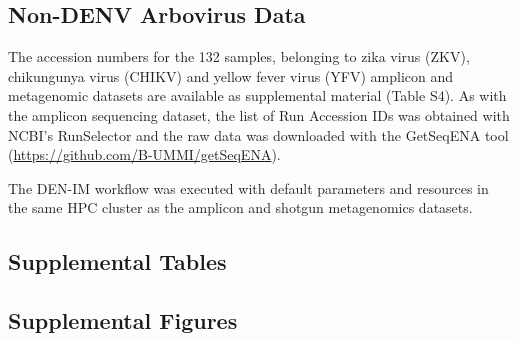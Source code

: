 \subsection{Non-DENV Arbovirus Data} \label{chap4_sup_non_denv}

The accession numbers for the 132 samples, belonging to zika virus (ZKV), chikungunya virus (CHIKV) and yellow fever virus (YFV) amplicon and metagenomic datasets are available as supplemental material (Table S4). As with the amplicon sequencing dataset, the list of Run Accession IDs was obtained with NCBI’s RunSelector and the raw data was downloaded with the GetSeqENA tool (\url{https://github.com/B-UMMI/getSeqENA}). 

The DEN-IM workflow was executed with default parameters and resources in the same HPC cluster as the amplicon and shotgun metagenomics datasets.

\subsection{Supplemental Tables} \label{chap4_sup_tables}



\newpage





\newpage



\newpage













\subsection{Supplemental Figures} \label{chap4_sup_figures}

